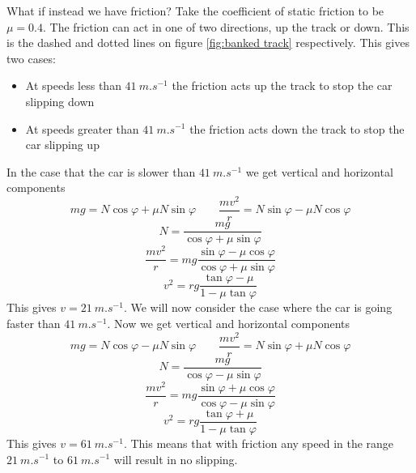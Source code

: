 \documentclass{article}
\begin{document}
    What if instead we have friction?
    Take the coefficient of static friction to be \(\mu = 0.4\).
    The friction can act in one of two directions, up the track or down.
    This is the dashed and dotted lines on figure \ref{fig:banked track} respectively.
    This gives two cases:
    \begin{itemize}
        \item At speeds less than \(\SI{41}{m.s^{-1}}\) the friction acts up the track to stop the car slipping down
        \item At speeds greater than \(\SI{41}{m.s^{-1}}\) the friction acts down the track to stop the car slipping up
    \end{itemize}
    In the case that the car is slower than \(\SI{41}{m.s^{-1}}\) we get vertical and horizontal components
    \[mg = N\cos\varphi + \mu N\sin\varphi \qquad \frac{mv^2}{r} = N\sin\varphi - \mu N\cos\varphi\]
    \[N = \frac{mg}{\cos\varphi + \mu\sin\varphi}\]
    \[\frac{mv^2}{r} = mg\frac{\sin\varphi - \mu\cos\varphi}{\cos\varphi + \mu \sin\varphi}\]
    \[v^2 = rg\frac{\tan\varphi - \mu}{1 - \mu\tan\varphi}\]
    This gives \(v = \SI{21}{m.s^{-1}}\).
    We will now consider the case where the car is going faster than \(\SI{41}{m.s^{-1}}\).
    Now we get vertical and horizontal components
    \[mg = N\cos\varphi - \mu N \sin\varphi\qquad \frac{mv^2}{r} = N\sin\varphi + \mu N\cos\varphi\]
    \[N = \frac{mg}{\cos\varphi - \mu \sin\varphi}\]
    \[\frac{mv^2}{r} = mg\frac{\sin\varphi + \mu\cos\varphi}{\cos\varphi - \mu\sin\varphi}\]
    \[v^2 = rg\frac{\tan\varphi + \mu}{1 - \mu\tan\varphi}\]
    This gives \(v = \SI{61}{m.s^{-1}}\).
    This means that with friction any speed in the range \(\SI{21}{m.s^{-1}}\) to \(\SI{61}{m.s^{-1}}\) will result in no slipping.
    
\end{document}
